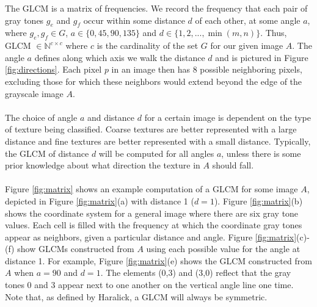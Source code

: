 \documentclass{article}
\begin{document}
    The GLCM is a matrix of frequencies. We record the frequency that each pair of gray tones $g_e$ and $g_f$ occur within some distance $d$ of each other, at some angle $a$, where $g_e, g_f \in G$, $a \in \{0, 45, 90, 135\}$ and $d \in \{1, 2, ..., \min(m, n)\}$. Thus, GLCM $\in \mathbb{N}^{c \times c}$ where $c$ is the cardinality of the set $G$ for our given image $A$. The angle $a$ defines along which axis we walk the distance $d$ and is pictured in Figure \ref{fig:directions}. Each pixel $p$ in an image then has 8 possible neighboring pixels, excluding those for which these neighbors would extend beyond the edge of the grayscale image $A$. \\ \\
        The choice of angle $a$ and distance $d$ for a certain image is dependent on the type of texture being classified. Coarse textures are better represented with a large distance and fine textures are better represented with a small distance. Typically, the GLCM of distance $d$ will be computed for all angles $a$, unless there is some prior knowledge about what direction the texture in $A$ should fall. \\ \\
       Figure \ref{fig:matrix} shows an example computation of a GLCM for some image $A$, depicted in Figure \ref{fig:matrix}(a) with distance 1 ($d = 1$). Figure \ref{fig:matrix}(b) shows the coordinate system for a general image where there are six gray tone values. Each cell is filled with the frequency at which the coordinate gray tones appear as neighbors, given a particular distance and angle. Figure \ref{fig:matrix}(c)-(f) show GLCMs constructed from $A$ using each possible value for the angle at distance 1. For example, Figure \ref{fig:matrix}(e) shows the GLCM constructed from $A$ when $a = 90$ and $d = 1$. The elements (0,3) and (3,0) reflect that the gray tones 0 and 3 appear next to one another on the vertical angle line one time. Note that, as defined by Haralick, a GLCM will always be symmetric. 
\end{document}
